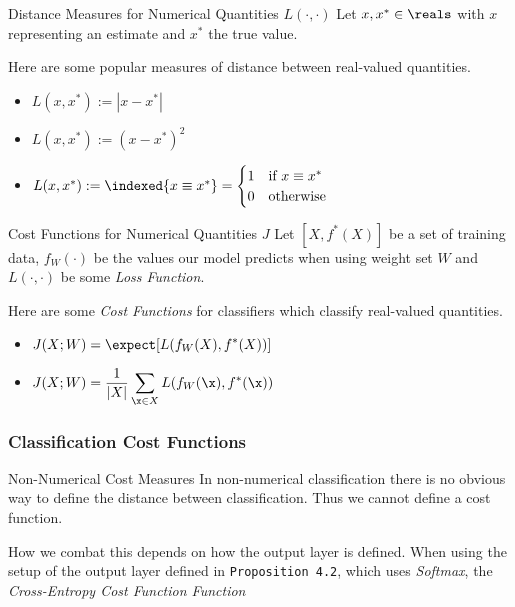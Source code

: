 \documentclass[11pt,a4paper]{article}
\begin{document}
  \begin{proposition}{Distance Measures for Numerical Quantities $L(\cdot,\cdot)$}
    Let $x,x^*\in\reals$ with $x$ representing an estimate and $x^*$ the true value.
    \par Here are some popular measures of distance between real-valued quantities.
    \begin{itemize}
      \item[\textit{Identity Distance}] $L(x,x^*):=|x-x^*|$
      \item[\textit{Absolute Distance}] $L(x,x^*):=(x-x^*)^2$
      \item[\textit{Quadratic Distance}] $L(x,x^*):=\indexed\{x\equiv x^*\}=\begin{cases}1&\text{if }x\equiv x^*\\0&\text{otherwise} \end{cases}$
    \end{itemize}
  \end{proposition}

  \begin{proposition}{Cost Functions for Numerical Quantities $J$}
    Let $[X,f^*(X)]$ be a set of training data, $f_W(\cdot)$ be the values our model predicts when using weight set $W$ and $L(\cdot,\cdot)$ be some \textit{Loss Function}.
    \par Here are some \textit{Cost Functions} for classifiers which classify real-valued quantities.
    \begin{itemize}
      \item[\textit{Expected Loss}] $\displaystyle J(X;W)=\expect[L(f_W(X),f^*(X))]$
      \item[\textit{Empirical Risk}] $\displaystyle J(X;W)=\frac1{|X|}\sum_{\x\in X}L(f_W(\x),f^*(\x))$
    \end{itemize}
  \end{proposition}

\subsubsection{Classification Cost Functions} \label{sec_ClassificationCostFunctions}

  \begin{remark}{Non-Numerical Cost Measures}
    In non-numerical classification there is no obvious way to define the distance between classification. Thus we cannot define a cost function.
    \par How we combat this depends on how the output layer is defined. When using the setup of the output layer defined in \texttt{Proposition 4.2}, which uses \textit{Softmax}, the \textit{Cross-Entropy Cost Function Function}
  \end{remark}
\end{document}
